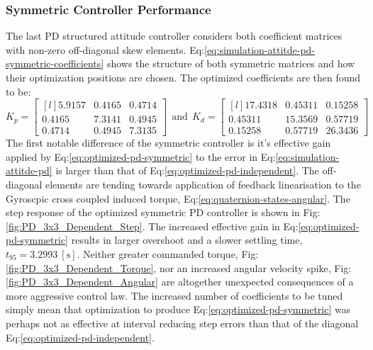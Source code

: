 \subsubsection{Symmetric Controller Performance}
\label{subsubsec:simulation.atttiude.pd.3x3}
The last PD structured attitude controller considers both coefficient matrices with non-zero off-diagonal skew elements. Eq:\ref{eq:simulation-attitde-pd-symmetric-coefficients} shows the structure of both symmetric matrices and how their optimization positions are chosen. The optimized coefficients are then found to be:
\begin{equation}\label{eq:optimized-pd-symmetric}
K_p = \begin{bmatrix*}[l]
5.9157 & 0.4165 & 0.4714\\
0.4165 & 7.3141 & 0.4945\\
0.4714 & 0.4945 & 7.3135
\end{bmatrix*}
~~\text{and}~~K_d = \begin{bmatrix*}[l]
17.4318 & 0.45311 & 0.15258\\
0.45311 & 15.3569 & 0.57719\\
0.15258 & 0.57719 & 26.3436
\end{bmatrix*}
\end{equation}
The first notable difference of the symmetric controller is it's effective gain applied by Eq:\ref{eq:optimized-pd-symmetric} to the error in Eq:\ref{eq:simulation-attitde-pd} is larger than that of Eq:\ref{eq:optimized-pd-independent}. The off-diagonal elements are tending towards application of feedback linearisation to the Gyroscpic cross coupled induced torque, Eq:\ref{eq:quaternion-states-angular}. The step response of the optimized symmetric PD controller is shown in Fig:\ref{fig:PD_3x3_Dependent_Step}. The increased effective gain in Eq:\ref{eq:optimized-pd-symmetric} results in larger overshoot and a slower settling time, $t_{95}=3.2993~[\text{s}]$. Neither greater commanded torque, Fig:\ref{fig:PD_3x3_Dependent_Torque}, nor an increased angular velocity spike, Fig:\ref{fig:PD_3x3_Dependent_Angular} are altogether unexpected consequences of a more aggressive control law. The increased number of coefficients to be tuned simply mean that optimization to produce Eq:\ref{eq:optimized-pd-symmetric} was perhaps not as effective at interval reducing step errors than that of the diagonal Eq:\ref{eq:optimized-pd-independent}.
\newpage
